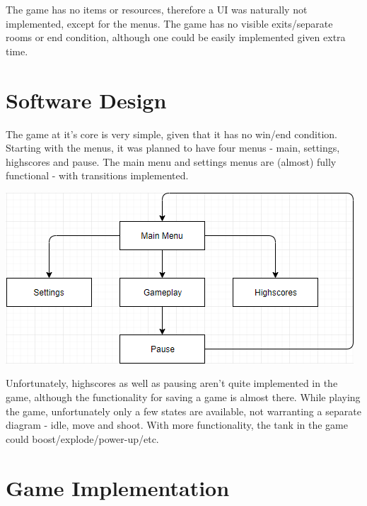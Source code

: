\documentclass[12pt]{article}
\begin{document}
The game has no items or resources, therefore a UI was naturally not implemented, except for the menus. The game has no visible exits/separate rooms or end condition, although one could be easily implemented given extra time.

\clearpage

\section{Software Design}

The game at it's core is very simple, given that it has no win/end condition. Starting with the menus, it was planned to have four menus - main, settings, highscores and pause. The main menu and settings menus are (almost) fully functional - with transitions implemented. \newline

\includegraphics[width=\textwidth,height=\textheight,keepaspectratio]{MenuState}

\hspace{1cm}

Unfortunately, highscores as well as pausing aren't quite implemented in the game, although the functionality for saving a game is almost there. While playing the game, unfortunately only a few states are available, not warranting a separate diagram - idle, move and shoot. With more functionality, the tank in the game could boost/explode/power-up/etc.

\clearpage

\section{Game Implementation}
\end{document}
